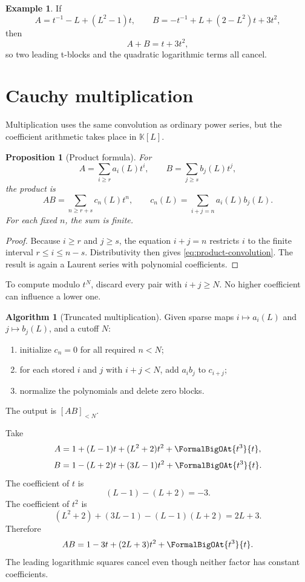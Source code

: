 \documentclass[11pt,openany]{book}
\theoremstyle{definition}
\newtheorem{example}{Example}[chapter]
\newtheorem{algorithm}{Algorithm}[chapter]
\theoremstyle{plain}
\newtheorem{proposition}{Proposition}[chapter]
\theoremstyle{remark}
\newcommand{\K}{\mathbb{K}}
\begin{document}
\begin{example}
If
\[
 A=t^{-1}-L+(L^2-1)t,
 \qquad
 B=-t^{-1}+L+(2-L^2)t+3t^2,
\]
then
\[
 A+B=t+3t^2,
\]
so two leading t-blocks and the quadratic logarithmic terms all cancel.
\end{example}

\section{Cauchy multiplication}
Multiplication uses the same convolution as ordinary power series, but the
coefficient arithmetic takes place in \(\K[L]\).

\begin{proposition}[Product formula]\label{prop:product-formula}
For
\[
 A=\sum_{i\ge r}a_i(L)t^i,
 \qquad
 B=\sum_{j\ge s}b_j(L)t^j,
\]
the product is
\begin{equation}\label{eq:product-convolution}
 AB=\sum_{n\ge r+s}c_n(L)t^n,
 \qquad
 c_n(L)=\sum_{i+j=n}a_i(L)b_j(L).
\end{equation}
For each fixed \(n\), the sum is finite.
\end{proposition}
\begin{proof}
Because \(i\ge r\) and \(j\ge s\), the equation \(i+j=n\) restricts
\(i\) to the finite interval \(r\le i\le n-s\).  Distributivity then gives
\cref{eq:product-convolution}.  The result is again a Laurent series with
polynomial coefficients.
\end{proof}

To compute modulo \(t^N\), discard every pair with \(i+j\ge N\).  No higher
coefficient can influence a lower one.

\begin{algorithm}[Truncated multiplication]\label{alg:mul}
Given sparse maps \(i\mapsto a_i(L)\) and \(j\mapsto b_j(L)\), and a cutoff
\(N\):
\begin{enumerate}
\item initialize \(c_n=0\) for all required \(n<N\);
\item for each stored \(i\) and \(j\) with \(i+j<N\), add \(a_i b_j\) to
      \(c_{i+j}\);
\item normalize the polynomials and delete zero blocks.
\end{enumerate}
The output is \([AB]_{<N}\).
\end{algorithm}

\begin{workedbox}
Take
\[
 A=1+(L-1)t+(L^2+2)t^2+\FormalBigOAt{t^3}{t},
\]
\[
 B=1-(L+2)t+(3L-1)t^2+\FormalBigOAt{t^3}{t}.
\]
The coefficient of \(t\) is
\[
 (L-1)-(L+2)=-3.
\]
The coefficient of \(t^2\) is
\[
 (L^2+2)+(3L-1)-(L-1)(L+2)=2L+3.
\]
Therefore
\[
 AB=1-3t+(2L+3)t^2+\FormalBigOAt{t^3}{t}.
\]
The leading logarithmic squares cancel even though neither factor has constant
coefficients.
\end{workedbox}
\end{document}
